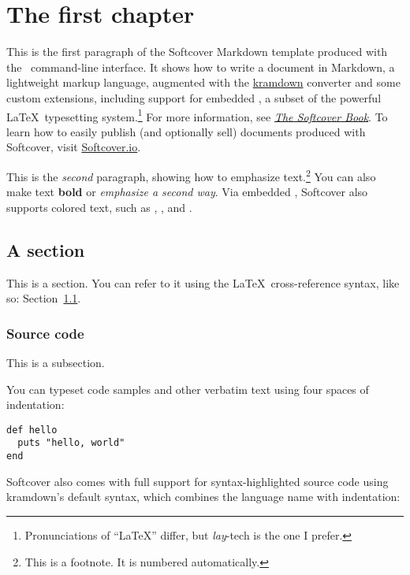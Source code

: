 \chapter{The first chapter}

\label{cha:a_chapter}

This is the first paragraph of the Softcover Markdown template produced with the \softcover\ command-line interface. It shows how to write a document in Markdown, a lightweight markup language, augmented with the \href{http://kramdown.gettalong.org/}{kramdown} converter and some custom extensions, including support for embedded \PolyTeX, a subset of the powerful \LaTeX\ typesetting system.\footnote{Pronunciations of ``LaTeX'' differ, but \emph{lay}-tech is the one I prefer.} For more information, see \href{http://manual.softcover.io/book}{\emph{The Softcover Book}}. To learn how to easily publish (and optionally sell) documents produced with Softcover, visit \href{http://softcover.io/}{Softcover.io}.

This is the \emph{second} paragraph, showing how to emphasize text.\footnote{This is a footnote. It is numbered automatically.} You can also make text \textbf{bold} or \emph{emphasize a second way}. Via embedded \PolyTeX, Softcover also supports colored text, such as , , and .

\section{A section}

\label{sec:a_section}

This is a section. You can refer to it using the \LaTeX\ cross-reference syntax, like so: Section~\ref{sec:a_section}.

\subsection{Source code}

This is a subsection.

You can typeset code samples and other verbatim text using four spaces of indentation:

\begin{verbatim}
def hello
  puts "hello, world"
end
\end{verbatim}

Softcover also comes with full support for syntax-highlighted source code using kramdown's default syntax, which combines the language name with indentation:


